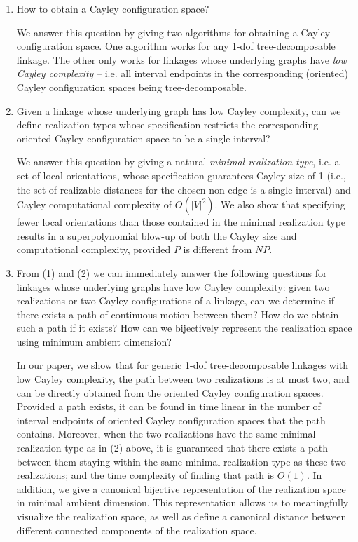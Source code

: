 \documentclass[secthm,amsthm,english]{article}
\theoremstyle{definition}
\theoremstyle{remark}
\begin{document}
\begin{enumerate}[(1)]

	\item How to obtain a Cayley configuration space?
	
	We answer this question by giving two algorithms for obtaining a Cayley configuration space. 
	One algorithm works for any 1-dof tree-decomposable linkage. 
	The other only works for linkages whose underlying graphs have \emph{low Cayley complexity} -- 
	i.e. all interval endpoints in the corresponding (oriented) Cayley configuration spaces being tree-decomposable.

	\item Given a linkage whose underlying graph has low Cayley complexity, 
	can we define realization types whose specification
	restricts the corresponding oriented Cayley configuration space to be a single interval?

	We answer this question by giving a natural \emph{minimal realization type}, i.e. a set of local orientations, whose specification guarantees Cayley size of 1 (i.e., the set of realizable distances for the chosen non-edge is a single interval) 
	and  Cayley computational complexity of $O(|V|^2)$.
	We also show that specifying fewer local orientations than those contained in the minimal realization type results in a
	superpolynomial blow-up of  both the Cayley size and computational complexity, provided $P$ is different
	from $NP$.

	\item From (1) and (2) we can
	immediately answer the following questions for linkages whose underlying graphs have low Cayley complexity:	
	given two realizations or two Cayley configurations of a linkage, can we determine if there exists a path of continuous motion between them? How do we obtain such a path if it exists? 
	How can we bijectively represent the realization space using minimum ambient dimension?
	
	

	In our paper, we  show that for generic 1-dof tree-decomposable linkages with low Cayley complexity, 
	the path between two realizations is at most two, and can be directly obtained from the oriented Cayley configuration spaces. 
	Provided a path exists, it can be found in time linear in the number of interval endpoints of oriented Cayley configuration spaces that the path contains. 
	Moreover, when the two realizations have the same minimal realization type as in (2) above, 
	it is guaranteed that there exists a path between them  staying within the same minimal realization type as these two realizations; 
	and the time complexity of finding that path is $O(1)$. 
    In addition, we give a canonical bijective representation of the realization space in minimal ambient dimension.
    This representation allows us to meaningfully visualize the realization space, as well as define 
    a canonical distance between different connected components of the realization space. 
	

\end{enumerate}
\end{document}
